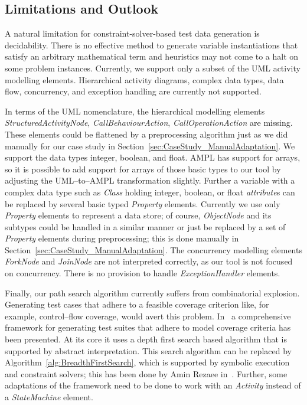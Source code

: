 \documentclass[runningheads,a4paper]{llncs}%
\newcommand{\UMLType}[1]{\textsf{\textit{#1}}} %
\newcommand{\UMLReference}[1]{\textsf{\textit{#1}}} %
\begin{document}
\subsection{Limitations and Outlook}
A natural limitation for constraint-solver-based test data generation is
decidability. There is no effective method to generate variable instantiations
that satisfy an arbitrary mathematical term and heuristics may not come to a
halt on some problem instances. Currently, we support only a subset of the UML
activity modelling elements. Hierarchical activity diagrams, complex data types,
data flow, concurrency, and exception handling are currently not supported.

In terms of the UML nomenclature, the hierarchical modelling elements
\UMLType{StructuredActivityNode}, \UMLType{CallBehaviourAction},
\UMLType{CallOperationAction} are missing. These elements could be flattened by
a preprocessing algorithm just as we did manually for our case study in
Section~\ref{sec:CaseStudy_ManualAdaptation}. We support the data types integer,
boolean, and float. AMPL has support for arrays, so it is possible to add
support for arrays of those basic types to our tool by adjusting the
UML--to--AMPL transformation slightly. Further a variable with a complex data
type such as \UMLType{Class} holding integer, boolean, or float
\UMLReference{attribute}s can be replaced by several basic typed
\UMLType{Property} elements. Currently we use only \UMLType{Property} elements
to represent a data store; of course, \UMLType{ObjectNode} and its subtypes
could be handled in a similar manner or just be replaced by a set of
\UMLType{Property} elements during preprocessing; this is done manually in
Section~\ref{sec:CaseStudy_ManualAdaptation}. The concurrency modelling elements
\UMLType{ForkNode} and \UMLType{JoinNode} are not interpreted correctly, as our
tool is not focused on concurrency. There is no provision to handle
\UMLType{ExceptionHandler} elements.

Finally, our path search algorithm currently suffers from combinatorial
explosion. Generating test cases that adhere to a feasible coverage criterion
like, for example, control--flow coverage, would avert this problem.
In~\cite{ParTeG} a comprehensive framework for generating test suites that
adhere to model coverage criteria has been presented. At its core it uses a
depth first search based algorithm that is supported by abstract interpretation.
This search algorithm can be replaced by Algorithm~\ref{alg:BreadthFirstSearch},
which is supported by symbolic execution and constraint solvers; this has been
done by Amin Rezaee in~\cite{Rezaee2014ANew}. Further, some adaptations of the
framework need to be done to work with an \UMLType{Activity} instead of a
\UMLType{StateMachine} element.
%
\end{document}
